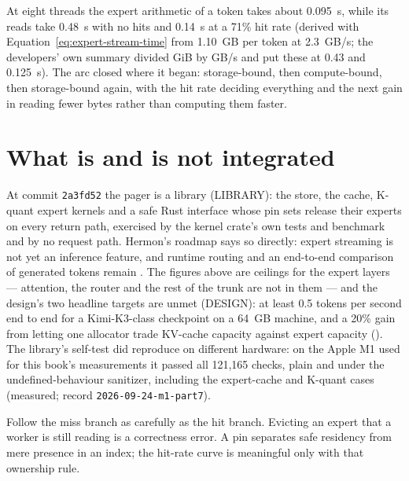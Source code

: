 At eight threads the expert arithmetic of a token takes about 0.095~s, while its
reads take 0.48~s with no hits and 0.14~s at a 71\% hit rate (derived with
Equation~\ref{eq:expert-stream-time} from 1.10~GB per token at 2.3~GB/s; the
developers' own summary divided GiB by GB/s and put these at 0.43 and 0.125~s).
The arc closed where it began: storage-bound, then compute-bound, then
storage-bound again, with the hit rate deciding everything and the next gain
in reading fewer bytes rather than computing them faster.

\section{What is and is not integrated}

At commit \texttt{2a3fd52} the pager is a library (LIBRARY): the store, the
cache, K-quant expert kernels and a safe Rust interface whose pin sets release
their experts on every return path, exercised by the kernel crate's own tests and
benchmark and by no request path. Hermon's roadmap says so directly: expert
streaming is not yet an inference feature, and runtime routing and an
end-to-end comparison of generated tokens remain
\cite[phase K4--K7]{hermon2026roadmap}. The figures above are ceilings for the
expert layers --- attention, the router and the rest of the trunk are not in
them --- and the design's two headline targets are unmet (DESIGN): at least
0.5 tokens per second end to end for a Kimi-K3-class checkpoint on a 64~GB
machine, and a 20\% gain from letting one allocator trade KV-cache capacity
against expert capacity (). The library's self-test did
reproduce on different hardware: on the Apple M1 used for this book's
measurements it passed all 121,165 checks, plain and under the undefined-behaviour
sanitizer, including the expert-cache and K-quant cases (measured; record
\texttt{2026-09-24-m1-part7}).

Follow the miss branch as carefully as the hit branch. Evicting an expert that a worker is still reading is a correctness error. A pin separates safe residency from mere presence in an index; the hit-rate curve is meaningful only with that ownership rule.


